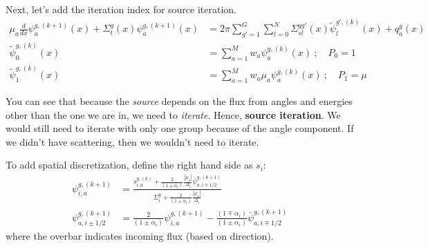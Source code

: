 \documentclass[12pt]{article}
\newcommand{\Di}{\ensuremath{\Delta_i}}
\begin{document}
Next, let's add the iteration index for source iteration.  
\begin{align}
\mu_a \frac{d}{dx}\psi_{a}^{g, (k+1)}(x) + \Sigma_{t}^g(x) \psi_{a}^{g, (k+1)}(x) &= 2\pi \sum_{g'=1}^G
  \sum_{l=0}^N \Sigma_{sl}^{gg'}(x) \tilde{\psi}^{g', (k)}_l(x) + q_{a}^g(x)\\
\tilde{\psi}^{g, (k)}_0(x) &= \sum_{a=1}^M w_a \psi_a^{g, (k)}(x)\:; \quad P_0 = 1\\
\tilde{\psi}^{g, (k)}_1(x) &= \sum_{a=1}^M w_a \mu_a \psi_a^{g, (k)}(x)\:; \quad P_1 = \mu
\end{align}

You can see that because the \textit{source} depends on the flux from angles and energies other than the one we are in, we need to \textit{iterate}. Hence, \textbf{source iteration}. We would still need to iterate with only one group because of the angle component. If we didn't have scattering, then we wouldn't need to iterate. 

To add spatial discretization, define the right hand side as $s_i$:
\begin{align}
\psi_{i,a}^{g,(k+1)} &= \frac{s_{i,a}^{g,(k)} + \frac{2}{(1\pm\alpha_i)}\frac{|\mu_a|}{\Di}\bar{\psi}^{g,(k+1)}_{a,i\mp1/2}}{
      \Sigma_{i}^g + \frac{2}{(1\pm\alpha_i)}\frac{|\mu_a|}{\Di}} \label{eq:dd}\\
%
%
\psi_{a,i\pm1/2}^{g,(k+1)} &= \frac{2}{(1\pm\alpha_i)}\psi_{i,a}^{g,(k+1)}-
    \frac{(1\mp\alpha_i)}{(1\pm\alpha_i)}\bar{\psi}_{a,i\mp1/2}^{g,(k+1)} \label{eq:out}
\end{align}
where the overbar indicates incoming flux (based on direction).
\end{document}
